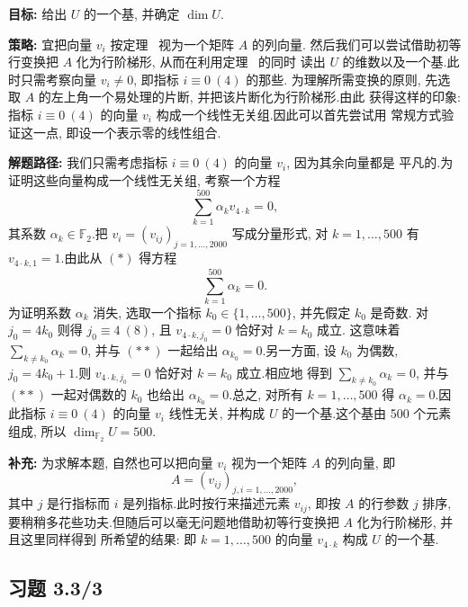 \noindent\textbf{目标:} 给出 $U$ 的一个基, 并确定 $\dim U$.

\noindent\textbf{策略:} 宜把向量 $v_i$ 按定理~ 视为一个矩阵 $A$ 的列向量.
然后我们可以尝试借助初等行变换把 $A$ 化为行阶梯形, 从而在利用定理~ 的同时
读出 $U$ 的维数以及一个基.此时只需考察向量 $v_i \neq 0$, 即指标 $i \equiv 0 \ (4)$ 的那些.
为理解所需变换的原则, 先选取 $A$ 的左上角一个易处理的片断, 并把该片断化为行阶梯形.由此
获得这样的印象: 指标 $i \equiv 0 \ (4)$ 的向量 $v_i$ 构成一个线性无关组.因此可以首先尝试用
常规方式验证这一点, 即设一个表示零的线性组合.

\noindent\textbf{解题路径:} 我们只需考虑指标 $i \equiv 0 \ (4)$ 的向量 $v_i$, 因为其余向量都是
平凡的.为证明这些向量构成一个线性无关组, 考察一个方程
\begin{equation}
\sum_{k = 1}^{500} \alpha_k v_{4 \cdot k} = 0, \tag{$*$}
\end{equation}
其系数 $\alpha_k \in \mathbb{F}_2$.把 $v_i = (v_{ij})_{j = 1, \ldots, 2000}$ 写成分量形式,
对 $k = 1, \ldots, 500$ 有 $v_{4 \cdot k, 1} = 1$.由此从 $(*)$ 得方程
\begin{equation}
\sum_{k = 1}^{500} \alpha_k = 0\text{.} \tag{$**$}
\end{equation}
为证明系数 $\alpha_k$ 消失, 选取一个指标 $k_0 \in \{1, \ldots, 500\}$, 并先假定 $k_0$ 是奇数.
对 $j_0 = 4k_0$ 则得 $j_0 \equiv 4 \ (8)$, 且 $v_{4 \cdot k, j_0} = 0$ 恰好对 $k = k_0$ 成立.
这意味着 $\sum_{k \neq k_0} \alpha_k = 0$, 并与 $(**)$ 一起给出 $\alpha_{k_0} = 0$.另一方面,
设 $k_0$ 为偶数, $j_0 = 4k_0 + 1$.则 $v_{4 \cdot k, j_0} = 0$ 恰好对 $k = k_0$ 成立.相应地
得到 $\sum_{k \neq k_0} \alpha_k = 0$, 并与 $(**)$ 一起对偶数的 $k_0$ 也给出
$\alpha_{k_0} = 0$.总之, 对所有 $k = 1, \ldots, 500$ 得 $\alpha_k = 0$.因此指标
$i \equiv 0 \ (4)$ 的向量 $v_i$ 线性无关, 并构成 $U$ 的一个基.这个基由 500 个元素组成,
所以 $\dim_{\mathbb{F}_2} U = 500$.

\noindent\textbf{补充:} 为求解本题, 自然也可以把向量 $v_i$ 视为一个矩阵 $A$ 的列向量, 即
\[
A = (v_{ij})_{j, i = 1, \ldots, 2000},
\]
其中 $j$ 是行指标而 $i$ 是列指标.此时按行来描述元素 $v_{ij}$, 即按 $A$ 的行参数 $j$ 排序,
要稍稍多花些功夫.但随后可以毫无问题地借助初等行变换把 $A$ 化为行阶梯形, 并且这里同样得到
所希望的结果: 即 $k = 1, \ldots, 500$ 的向量 $v_{4 \cdot k}$ 构成 $U$ 的一个基.

\subsection*{习题 3.3/3}

